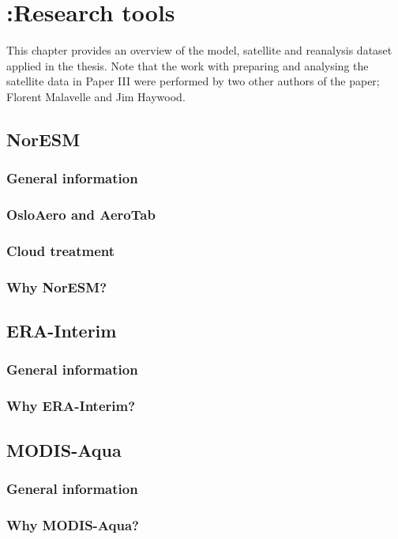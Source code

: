 \chapter[Research tools]{{\color{red} :}Research tools}
%
\label{ch:metode}
%

This chapter provides an overview of the model, satellite and reanalysis dataset applied in the thesis. Note that the work with preparing and analysing the satellite data in Paper III were performed by two other authors of the paper; Florent Malavelle and Jim Haywood. 

\section{NorESM}
\subsection{General information}
\subsection{OsloAero and AeroTab}

\subsection{Cloud treatment}

\subsection{Why NorESM?}


\section{ERA-Interim}
\subsection{General information}

\subsection{Why ERA-Interim?}


\section{MODIS-Aqua}
\subsection{General information}
\subsection{Why MODIS-Aqua?}




